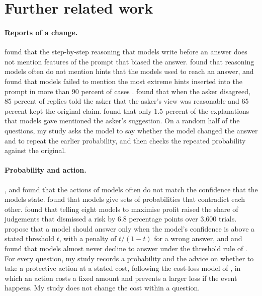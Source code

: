 \documentclass[11pt]{article}
\begin{document}
%



\appendix

\section{Further related work}\label{app:related}

\paragraph{Reports of a change.}
\citet{turpin2023} found that the step-by-step reasoning that models write before an answer does not mention features of the prompt that biased the answer. \citet{chen2025} found that reasoning models often do not mention hints that the models used to reach an answer, and \citet{hao2026} found that models failed to mention the most extreme hints inserted into the prompt in more than 90 percent of cases \citep[see also][]{ghafouri2024,feng2026,betley2026}. \citet{alnasser2026} found that when the asker disagreed, 85 percent of replies told the asker that the asker's view was reasonable and 65 percent kept the original claim. \citet{sicilia2024} found that only 1.5 percent of the explanations that models gave mentioned the asker's suggestion. On a random half of the questions, my study asks the model to say whether the model changed the answer and to repeat the earlier probability, and then checks the repeated probability against the original.

\paragraph{Probability and action.}
\citet{pal2025}, \citet{yamin2026} and \citet{wang2026} found that the actions of models often do not match the confidence that the models state. \citet{andrews2026} found that models give sets of probabilities that contradict each other. \citet{so2026} found that telling eight models to maximise profit raised the share of judgements that dismissed a risk by 6.8 percentage points over 3,600 trials. \citet{kalai2025} propose that a model should answer only when the model's confidence is above a stated threshold $t$, with a penalty of $t/(1-t)$ for a wrong answer, and \citet{wang2026} and \citet{mohamadi2025} found that models almost never decline to answer under the threshold rule of \citeauthor{kalai2025} \citep[see also][]{wu2025answer,he2026,wu2025bcrl}. For every question, my study records a probability and the advice on whether to take a protective action at a stated cost, following the cost-loss model of \citet{murphy1977}, in which an action costs a fixed amount and prevents a larger loss if the event happens. My study does not change the cost within a question.
\end{document}
